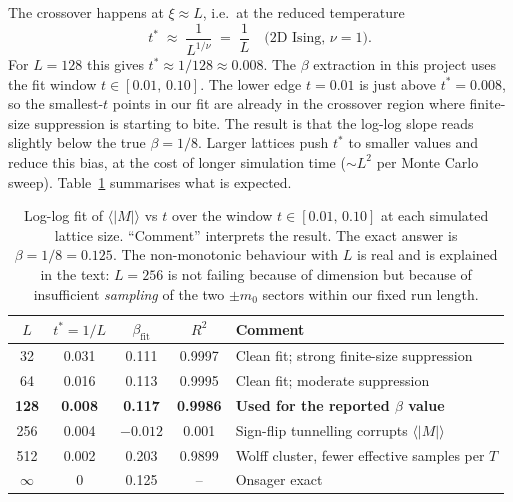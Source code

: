 \documentclass[12pt,a4paper]{article}
\begin{document}
The crossover happens at $\xi \approx L$, i.e.\ at the reduced temperature
\begin{equation}
  t^* \;\approx\; \frac{1}{L^{1/\nu}} \;=\; \frac{1}{L}
  \quad\text{(2D Ising, $\nu = 1$)}.
  \label{eq:tstar}
\end{equation}
For $L = 128$ this gives $t^* \approx 1/128 \approx 0.008$. The $\beta$ extraction in
this project uses the fit window $t \in [0.01,\, 0.10]$. The lower edge $t = 0.01$ is
just above $t^* = 0.008$, so the smallest-$t$ points in our fit are already in the
crossover region where finite-size suppression is starting to bite. The result is that
the log-log slope reads slightly below the true $\beta = 1/8$. Larger lattices push
$t^*$ to smaller values and reduce this bias, at the cost of longer simulation time
($\sim L^2$ per Monte Carlo sweep). Table~\ref{tab:fss} summarises what is expected.

\begin{table}[h]
\centering
\caption{Log-log fit of $\langle|M|\rangle$ vs $t$ over the window $t \in [0.01,\, 0.10]$
at each simulated lattice size. ``Comment'' interprets the result. The exact answer is
$\beta = 1/8 = 0.125$. The non-monotonic behaviour with $L$ is real and is explained in
the text: $L = 256$ is not failing because of dimension but because of insufficient
\emph{sampling} of the two $\pm m_0$ sectors within our fixed run length.}
\label{tab:fss}
\begin{tabular}{ccccl}
\toprule
$L$ & $t^* = 1/L$ & $\beta_\mathrm{fit}$ & $R^2$ & Comment \\
\midrule
32       & 0.031 & 0.111   & 0.9997 & Clean fit; strong finite-size suppression \\
64       & 0.016 & 0.113   & 0.9995 & Clean fit; moderate suppression \\
\textbf{128} & \textbf{0.008} & \textbf{0.117} & \textbf{0.9986} & \textbf{Used for the reported $\beta$ value} \\
256      & 0.004 & $-0.012$ & 0.001  & Sign-flip tunnelling corrupts $\langle|M|\rangle$ \\
512      & 0.002 & 0.203   & 0.9899 & Wolff cluster, fewer effective samples per $T$ \\
$\infty$ & 0     & 0.125   & --     & Onsager exact \\
\bottomrule
\end{tabular}
\end{table}
\end{document}
